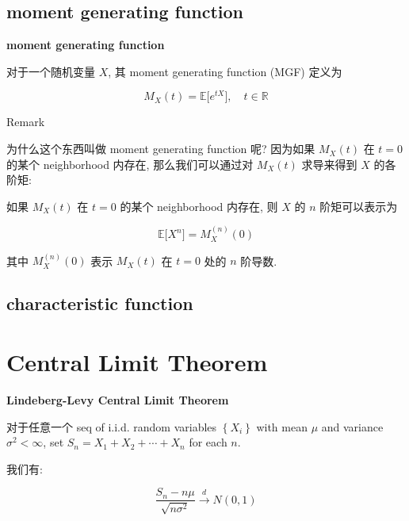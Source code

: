 \documentclass{qlnotes-export}
\begin{document}
\subsection{moment generating function}\label{moment-generating-function}

\begin{definition}{\protect{}\label{kn-moment-generating-function}{\textbf{moment
generating function}}}

对于一个随机变量 \(X\), 其 moment generating function (MGF) 定义为

\[M_{X}(t) = {\mathbb{E}}\lbrack e^{tX}\rbrack,\quad t \in {\mathbb{R}}\]

\end{definition}

\begin{qlremark}{Remark}

为什么这个东西叫做 moment generating function 呢? 因为如果 \(M_{X}(t)\) 在 \(t = 0\) 的某个 neighborhood 内存在, 那么我们可以通过对 \(M_{X}(t)\) 求导来得到 \(X\) 的各阶矩:

\end{qlremark}

\begin{proposition}

如果 \(M_{X}(t)\) 在 \(t = 0\) 的某个 neighborhood 内存在, 则 \(X\) 的 \(n\) 阶矩可以表示为

\[{\mathbb{E}}\lbrack X^{n}\rbrack = M_{X}^{(n)}(0)\]

其中 \(M_{X}^{(n)}(0)\) 表示 \(M_{X}(t)\) 在 \(t = 0\) 处的 \(n\) 阶导数.

\end{proposition}

\subsection{characteristic function}\label{characteristic-function}

\section{Central Limit Theorem}\label{central-limit-theorem-1}

\begin{theorem}{\protect{}\label{kn-lindeberg-levy-central-limit-theorem}{\textbf{Lindeberg-Levy
Central Limit Theorem}}}

对于任意一个 seq of i.i.d. random variables \(\left\{ X_{i} \right\}\) with mean \(\mu\) and variance \(\sigma^{2} < \infty\), set \(S_{n} = X_{1} + X_{2} + \cdots + X_{n}\) for each \(n\).

我们有:

\[\frac{S_{n} - n\mu}{\sqrt{n\sigma^{2}}}\overset{d}{\rightarrow}N(0,1)\]

\end{theorem}
\end{document}
